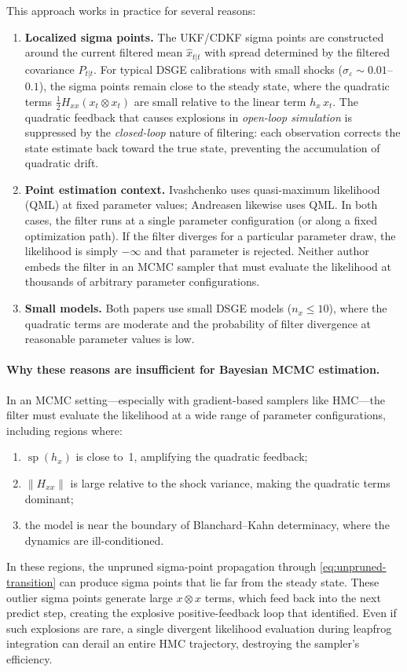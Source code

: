 \documentclass[12pt,a4paper]{article}
\newcommand{\kron}{\otimes}
\newcommand{\hx}{h_x}
\newcommand{\Hxx}{H_{xx}}
\DeclareMathOperator{\specrad}{sp}
\begin{document}
This approach works in practice for several reasons:
\begin{enumerate}[nosep]
\item \textbf{Localized sigma points.}
The UKF/CDKF sigma points are constructed around the current
filtered mean $\hat{x}_{t|t}$ with spread determined by the
filtered covariance $P_{t|t}$. For typical DSGE calibrations with
small shocks ($\sigma_\varepsilon \sim 0.01$--$0.1$), the sigma
points remain close to the steady state, where the quadratic
terms $\tfrac{1}{2}\Hxx(x_t \kron x_t)$ are small relative to the
linear term $\hx\,x_t$. The quadratic feedback that causes
explosions in \emph{open-loop simulation} is suppressed by the
\emph{closed-loop} nature of filtering: each observation corrects
the state estimate back toward the true state, preventing the
accumulation of quadratic drift.

\item \textbf{Point estimation context.}
Ivashchenko uses quasi-maximum likelihood (QML) at fixed parameter
values; Andreasen likewise uses QML. In both cases, the filter
runs at a single parameter configuration (or along a fixed
optimization path). If the filter diverges for a particular
parameter draw, the likelihood is simply $-\infty$ and that
parameter is rejected. Neither author embeds the filter in an
MCMC sampler that must evaluate the likelihood at thousands of
arbitrary parameter configurations.

\item \textbf{Small models.}
Both papers use small DSGE models ($n_x \leq 10$), where the
quadratic terms are moderate and the probability of filter
divergence at reasonable parameter values is low.
\end{enumerate}

\paragraph{Why these reasons are insufficient for Bayesian MCMC
estimation.}
In an MCMC setting---especially with gradient-based samplers like
HMC---the filter must evaluate the likelihood at a wide range of
parameter configurations, including regions where:
\begin{enumerate}[nosep]
\item $\specrad(\hx)$ is close to~1, amplifying the quadratic feedback;
\item $\|\Hxx\|$ is large relative to the shock variance,
making the quadratic terms dominant;
\item the model is near the boundary of Blanchard--Kahn determinacy,
where the dynamics are ill-conditioned.
\end{enumerate}
In these regions, the unpruned sigma-point propagation through
\eqref{eq:unpruned-transition} can produce sigma points that lie far
from the steady state. These outlier sigma points generate large
$x \kron x$ terms, which feed back into the next predict step,
creating the explosive positive-feedback loop that
\citet{kim2008calculating} identified. Even if such explosions are
rare, a single divergent likelihood evaluation during leapfrog
integration can derail an entire HMC trajectory, destroying the
sampler's efficiency.
\end{document}
